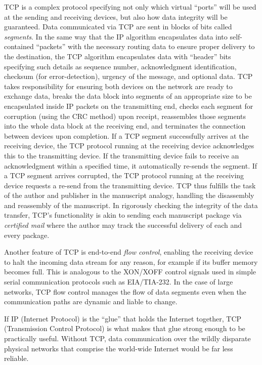 \vskip 10pt

TCP is a complex protocol specifying not only which virtual ``ports'' will be used at the sending and receiving devices, but also how data integrity will be guaranteed.  Data communicated via TCP are sent in blocks of bits called \textit{segments}.  In the same way that the IP algorithm encapsulates data into self-contained ``packets'' with the necessary routing data to ensure proper delivery to the destination, the TCP algorithm encapsulates data with ``header'' bits specifying such details as sequence number, acknowledgment identification, checksum (for error-detection), urgency of the message, and optional data.  TCP takes responsibility for ensuring both devices on the network are ready to exchange data, breaks the data block into segments of an appropriate size to be encapsulated inside IP packets on the transmitting end, checks each segment for corruption (using the CRC method) upon receipt, reassembles those segments into the whole data block at the receiving end, and terminates the connection between devices upon completion.  If a TCP segment successfully arrives at the receiving device, the TCP protocol running at the receiving device acknowledges this to the transmitting device.  If the transmitting device fails to receive an acknowledgment within a specified time, it automatically re-sends the segment.  If a TCP segment arrives corrupted, the TCP protocol running at the receiving device requests a re-send from the transmitting device.  TCP thus fulfills the task of the author and publisher in the manuscript analogy, handling the disassembly and reassembly of the manuscript.  In rigorously checking the integrity of the data transfer, TCP's functionality is akin to sending each manuscript package via \textit{certified mail} where the author may track the successful delivery of each and every package.

Another feature of TCP is end-to-end \textit{flow control}, enabling the receiving device to halt the incoming data stream for any reason, for example if its buffer memory becomes full.  This is analogous to the XON/XOFF control signals used in simple serial communication protocols such as EIA/TIA-232.  In the case of large networks, TCP flow control manages the flow of data segments even when the communication paths are dynamic and liable to change.    

If IP (Internet Protocol) is the ``glue'' that holds the Internet together, TCP (Transmission Control Protocol) is what makes that glue strong enough to be practically useful.  Without TCP, data communication over the wildly disparate physical networks that comprise the world-wide Internet would be far less reliable.

